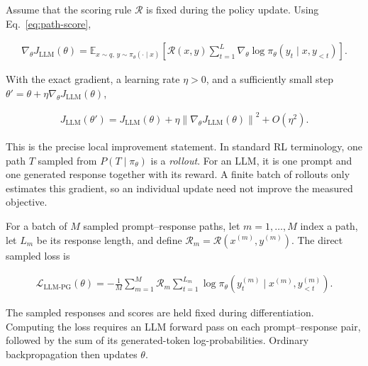 \documentclass[11pt]{article}
\newcommand{\E}{\mathbb{E}}
\begin{document}
Assume that the scoring rule \(\mathcal R\) is fixed during the policy update.
Using Eq.~\eqref{eq:path-score},

\begin{equation}
    \begin{split}
        \nabla_\theta J_{\mathrm{LLM}}(\theta)
          =\E_{x\sim q,\,y\sim\pi_\theta(\cdot\mid x)}
           \left[
           \mathcal R(x,y)
           \sum_{t=1}^{L}
           \nabla_\theta\log\pi_\theta(y_t\mid x,y_{<t})
           \right].
    \end{split}
    \label{eq:llm-policy-gradient}
\end{equation}

With the exact gradient, a learning rate \(\eta>0\), and a sufficiently small
step \(\theta'=\theta+\eta\nabla_\theta J_{\mathrm{LLM}}(\theta)\),

\begin{equation}
    \begin{split}
        J_{\mathrm{LLM}}(\theta')
          =J_{\mathrm{LLM}}(\theta)
           +\eta\left\|\nabla_\theta
           J_{\mathrm{LLM}}(\theta)\right\|^2
           +O(\eta^2).
    \end{split}
    \label{eq:llm-local-improvement}
\end{equation}

This is the precise local improvement statement.  In standard RL terminology,
one path \(T\) sampled from \(P(T\mid\pi_\theta)\) is a \emph{rollout}.  For
an LLM, it is one prompt and one generated response together with its reward.
A finite batch of rollouts only estimates this gradient, so an individual
update need not improve the measured objective.

For a batch of \(M\) sampled prompt--response paths, let \(m=1,\ldots,M\)
index a path, let \(L_m\) be its response length, and define
\(\mathcal R_m=\mathcal R(x^{(m)},y^{(m)})\).  The direct sampled loss is

\begin{equation}
    \begin{split}
        \mathcal L_{\mathrm{LLM\mbox{-}PG}}(\theta)
          =-\frac{1}{M}\sum_{m=1}^{M}\mathcal R_m
           \sum_{t=1}^{L_m}
           \log\pi_\theta
           \left(y_t^{(m)}\mid x^{(m)},y_{<t}^{(m)}\right).
    \end{split}
    \label{eq:llm-pg-loss}
\end{equation}

The sampled responses and scores are held fixed during differentiation.
Computing the loss requires an LLM forward pass on each prompt--response pair,
followed by the sum of its generated-token log-probabilities.  Ordinary
backpropagation then updates \(\theta\).
\end{document}
